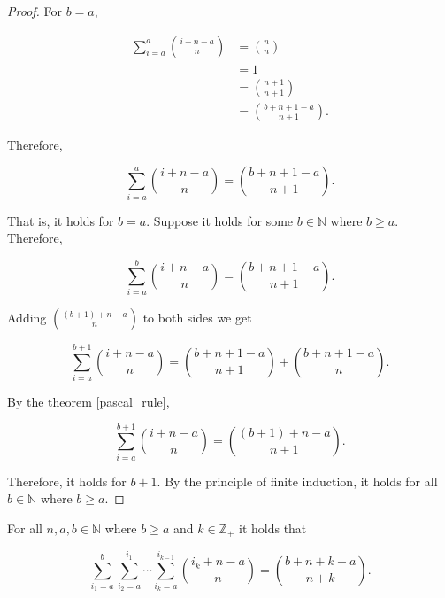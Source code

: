 \documentclass[12pt]{article}
\begin{document}
\begin{proof}

    For $b = a$,


    \begin{align*}
        \sum_{i=a}^{a} \binom{i+n-a}{n} & = \binom{n}{n}          \\
                                        & = 1                     \\
                                        & = \binom{n+1}{n+1}      \\
                                        & = \binom{b+n+1-a}{n+1}.
    \end{align*}

    Therefore,

    $$
        \sum_{i=a}^{a} \binom{i+n-a}{n} = \binom{b+n+1-a}{n+1}.
    $$

    That is, it holds for $b = a$. Suppose it holds for some $b \in \mathbb{N}$ where $b \geq a$. Therefore,


    $$
        \sum_{i=a}^{b} \binom{i+n-a}{n} = \binom{b+n+1-a}{n+1}.
    $$

    Adding $\displaystyle\binom{(b+1)+n-a}{n}$ to both sides we get

    $$
        \sum_{i=a}^{b+1} \binom{i+n-a}{n} = \binom{b+n+1-a}{n+1} + \binom{b+n+1-a}{n}.
    $$

    By the theorem \ref{pascal_rule},

    $$
        \boxed{\sum_{i=a}^{b+1} \binom{i+n-a}{n} = \binom{(b+1)+n-a}{n+1}}.
    $$

    Therefore, it holds for $b + 1$. By the principle of finite induction, it holds for all $b \in \mathbb{N}$ where $b \geq a$.

\end{proof}

\vspace{20px}

\begin{theorem}
    \label{expanded_hockey_stick_identity}

    For all $n, a, b \in \mathbb{N}$ where $b \geq a$ and $k \in \mathbb{Z_+}$ it holds that

    $$
        \sum_{i_1=a}^{b}\sum_{i_2=a}^{i_1} \cdots \sum_{i_k=a}^{i_{k-1}} \binom{i_k+n-a}{n} = \binom{b+n+k-a}{n+k}.
    $$

\end{theorem}
\end{document}
